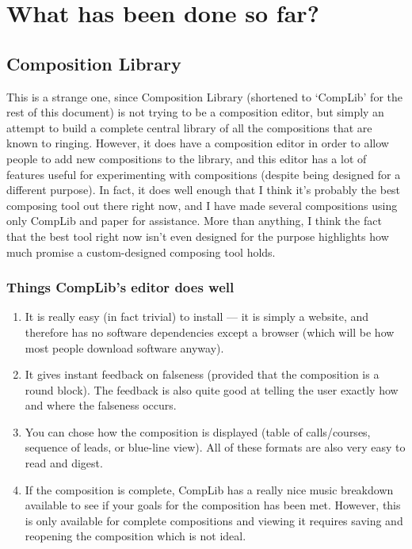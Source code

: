 \documentclass[12pt]{article}
\begin{document}
\section{What has been done so far?}

\subsection{Composition Library}

This is a strange one, since Composition Library (shortened to `CompLib' for the rest of this
document) is not trying to be a composition editor, but simply an attempt to build a complete
central library of all the compositions that are known to ringing.  However, it does have a
composition editor in order to allow people to add new compositions to the library, and this
editor has a lot of features useful for experimenting with compositions (despite being designed for
a different purpose).  In fact, it does well enough that I think it's probably the best composing
tool out there right now, and I have made several compositions using only CompLib and paper for
assistance.  More than anything, I think the fact that the best tool right now isn't even designed
for the purpose highlights how much promise a custom-designed composing tool holds.

\subsubsection{Things CompLib's editor does well}

\begin{enumerate}
    \item It is really easy (in fact trivial) to install --- it is simply a website, and therefore
        has no software dependencies except a browser (which will be how most people download
        software anyway).
    \item It gives instant feedback on falseness (provided that the composition is a round block).
        The feedback is also quite good at telling the user exactly how and where the falseness
        occurs.
    \item You can chose how the composition is displayed (table of calls/courses, sequence of leads,
        or blue-line view).  All of these formats are also very easy to read and digest.
    \item If the composition is complete, CompLib has a really nice music breakdown available to see
        if your goals for the composition has been met.  However, this is only available for
        complete compositions and viewing it requires saving and reopening the composition which is
        not ideal.
\end{enumerate}
\end{document}
